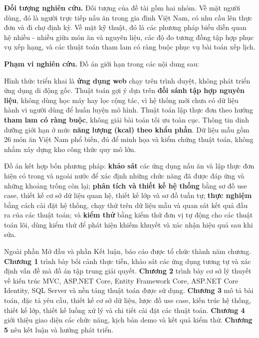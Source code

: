
\textbf{Đối tượng nghiên cứu.} Đối tượng của đề tài gồm hai nhóm. Về mặt người
dùng, đó là người trực tiếp nấu ăn trong gia đình Việt Nam, có nhu cầu lên thực
đơn và đi chợ định kỳ. Về mặt kỹ thuật, đó là các phương pháp biểu diễn quan hệ
nhiều - nhiều giữa món ăn và nguyên liệu, các độ đo tương đồng tập hợp phục vụ
xếp hạng, và các thuật toán tham lam có ràng buộc phục vụ bài toán xếp lịch.

\textbf{Phạm vi nghiên cứu.} Đồ án giới hạn trong các nội dung sau:

Hình thức triển khai là \textbf{ứng dụng web} chạy trên trình duyệt, không phát
triển ứng dụng di động gốc. Thuật toán gợi ý dựa trên \textbf{đối sánh tập hợp
nguyên liệu}, không dùng học máy hay lọc cộng tác, vì hệ thống mới chưa có dữ
liệu hành vi người dùng để huấn luyện mô hình. Thuật toán lập thực đơn theo
hướng \textbf{tham lam có ràng buộc}, không giải bài toán tối ưu toàn cục. Thông
tin dinh dưỡng giới hạn ở mức \textbf{năng lượng (kcal) theo khẩu phần}. Dữ liệu
mẫu gồm 26 món ăn Việt Nam phổ biến, đủ để minh họa và kiểm chứng thuật toán,
không nhằm xây dựng kho công thức quy mô lớn.


Đồ án kết hợp bốn phương pháp: \textbf{khảo sát} các ứng dụng nấu ăn và lập thực
đơn hiện có trong và ngoài nước để xác định những chức năng đã được đáp ứng và
những khoảng trống còn lại; \textbf{phân tích và thiết kế hệ thống} bằng sơ đồ
use case, thiết kế cơ sở dữ liệu quan hệ, thiết kế lớp và sơ đồ tuần tự;
\textbf{thực nghiệm} bằng cách cài đặt hệ thống, chạy thử trên dữ liệu mẫu và
quan sát kết quả đầu ra của các thuật toán; và \textbf{kiểm thử} bằng kiểm thử
đơn vị tự động cho các thuật toán lõi, dùng kiểm thử để phát hiện khiếm khuyết
và xác nhận hiệu quả sau khi sửa.


Ngoài phần Mở đầu và phần Kết luận, báo cáo được tổ chức thành năm chương.
\textbf{Chương 1} trình bày bối cảnh thực tiễn, khảo sát các ứng dụng tương tự
và xác định vấn đề mà đồ án tập trung giải quyết. \textbf{Chương 2} trình bày cơ
sở lý thuyết về kiến trúc MVC, ASP.NET Core, Entity Framework Core, ASP.NET Core
Identity, SQL Server và nền tảng thuật toán được sử dụng. \textbf{Chương 3} mô
tả bài toán, đặc tả yêu cầu, thiết kế cơ sở dữ liệu, lược đồ use case, kiến trúc
hệ thống, thiết kế lớp, thiết kế luồng xử lý và chi tiết cài đặt các thuật toán.
\textbf{Chương 4} giới thiệu giao diện các chức năng, kịch bản demo và kết quả
kiểm thử. \textbf{Chương 5} nêu kết luận và hướng phát triển.
